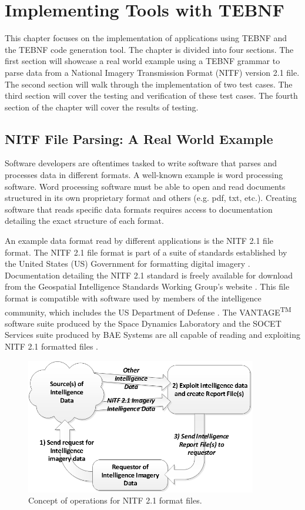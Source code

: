 \chapter{Implementing Tools with TEBNF}
This chapter focuses on the implementation of applications using TEBNF and the TEBNF code generation tool.  The chapter is divided into four sections.  The first section will showcase a real world example using a TEBNF grammar to parse data from a National Imagery Transmission Format (NITF) version 2.1 file.  The second section will walk through the implementation of two test cases.  The third section will cover the testing and verification of these test cases.  The fourth section of the chapter will cover the results of testing.

\section{NITF File Parsing: A Real World Example}
\label{sections:RealWorldNitfExample}
Software developers are oftentimes tasked to write software that parses and processes data in different formats.  A well-known example is word processing software.  Word processing software must be able to open and read documents structured in its own proprietary format and others (e.g. pdf, txt, etc.).  Creating software that reads specific data formats requires access to documentation detailing the exact structure of each format.

\indent
An example data format read by different applications is the NITF 2.1 file format.  The NITF 2.1 file format is part of a suite of standards established by the United States (US) Government for formatting digital imagery \cite{2500c_01}.  Documentation detailing the NITF 2.1 standard is freely available for download from the Geospatial Intelligence Standards Working Group’s website \cite{gwg_01}.  This file format is compatible with software used by members of the intelligence community, which includes the US Department of Defense \cite{2500c_01}.  The VANTAGE\textsuperscript{TM} software suite produced by the Space Dynamics Laboratory and the SOCET Services suite produced by BAE Systems are all capable of reading and exploiting NITF 2.1 formatted files \cite{sdl_01,bae_01}.

\begin{figure}[htbp]
\centering
\includegraphics[width=0.9\textwidth]{figures/NitfConops.png}
\caption{Concept of operations for NITF 2.1 format files.}
\label{fig:NitfConops}
\end{figure}

